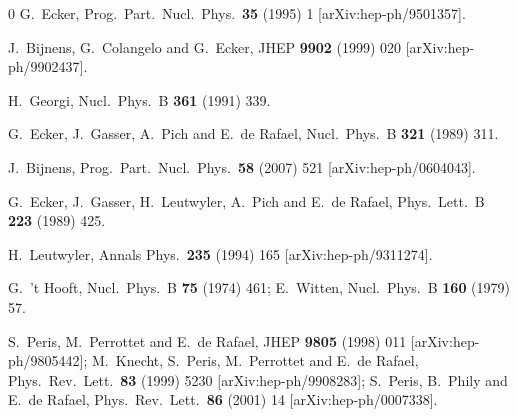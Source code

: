 \documentclass{appolb}
\begin{document}
{\begin{thebibliography}{0}
  G.~Ecker,
  Prog.\ Part.\ Nucl.\ Phys.\  {\bf 35} (1995) 1
  [arXiv:hep-ph/9501357].

  J.~Bijnens, G.~Colangelo and G.~Ecker,
  JHEP {\bf 9902} (1999) 020
  [arXiv:hep-ph/9902437].

  H.~Georgi,
  Nucl.\ Phys.\  B {\bf 361} (1991) 339.

  G.~Ecker, J.~Gasser, A.~Pich and E.~de Rafael,
  Nucl.\ Phys.\  B {\bf 321} (1989) 311.
  
  J.~Bijnens,
  Prog.\ Part.\ Nucl.\ Phys.\  {\bf 58} (2007) 521
  [arXiv:hep-ph/0604043].

  G.~Ecker, J.~Gasser, H.~Leutwyler, A.~Pich and E.~de Rafael,
  Phys.\ Lett.\  B {\bf 223} (1989) 425.
  
  H.~Leutwyler,
  Annals Phys.\  {\bf 235} (1994) 165
  [arXiv:hep-ph/9311274].
  
  G.~'t Hooft,
  Nucl.\ Phys.\  B {\bf 75} (1974) 461;
  E.~Witten,
  Nucl.\ Phys.\  B {\bf 160} (1979) 57.

  S.~Peris, M.~Perrottet and E.~de Rafael,
  JHEP {\bf 9805} (1998) 011
  [arXiv:hep-ph/9805442];
  M.~Knecht, S.~Peris, M.~Perrottet and E.~de Rafael,
  Phys.\ Rev.\ Lett.\  {\bf 83} (1999) 5230
  [arXiv:hep-ph/9908283];
  S.~Peris, B.~Phily and E.~de Rafael,
  Phys.\ Rev.\ Lett.\  {\bf 86} (2001) 14
  [arXiv:hep-ph/0007338].
  

\end{thebibliography}}
\end{document}
